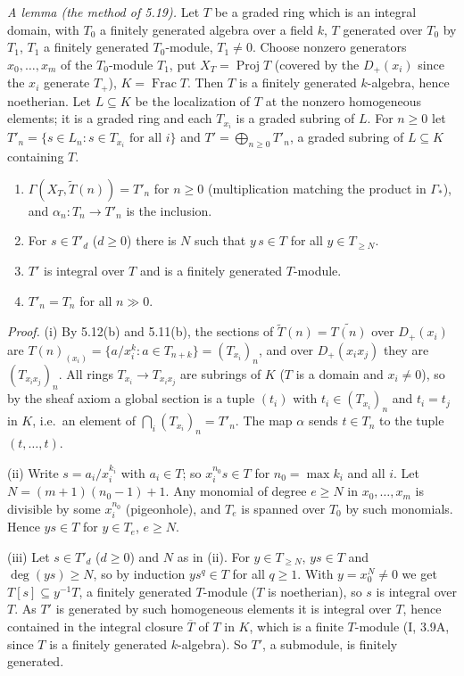 \documentclass[11pt]{article}
\begin{document}
\medskip
\emph{A lemma (the method of 5.19).} Let $T$ be a graded ring which is an integral domain, with $T_0$ a finitely generated algebra over a field $k$, $T$ generated over $T_0$ by $T_1$, $T_1$ a finitely generated $T_0$-module, $T_1\neq0$. Choose nonzero generators $x_0,\dots,x_m$ of the $T_0$-module $T_1$, put $X_T=\operatorname{Proj}T$ (covered by the $D_+(x_i)$ since the $x_i$ generate $T_+$), $K=\operatorname{Frac}T$. Then $T$ is a finitely generated $k$-algebra, hence noetherian. Let $L\subseteq K$ be the localization of $T$ at the nonzero homogeneous elements; it is a graded ring and each $T_{x_i}$ is a graded subring of $L$. For $n\ge0$ let $T'_n=\{s\in L_n: s\in T_{x_i}\text{ for all }i\}$ and $T'=\bigoplus_{n\ge0}T'_n$, a graded subring of $L\subseteq K$ containing $T$.
\begin{enumerate}[label=(\roman*),leftmargin=*]
\item $\Gamma(X_T,\widetilde{T}(n))=T'_n$ for $n\ge0$ (multiplication matching the product in $\Gamma_*$), and $\alpha_n:T_n\to T'_n$ is the inclusion.
\item For $s\in T'_d$ ($d\ge0$) there is $N$ such that $y\,s\in T$ for all $y\in T_{\ge N}$.
\item $T'$ is integral over $T$ and is a finitely generated $T$-module.
\item $T'_n=T_n$ for all $n\gg0$.
\end{enumerate}
\emph{Proof.} (i) By 5.12(b) and 5.11(b), the sections of $\widetilde T(n)=\widetilde{T(n)}$ over $D_+(x_i)$ are $T(n)_{(x_i)}=\{a/x_i^k:a\in T_{n+k}\}=(T_{x_i})_n$, and over $D_+(x_ix_j)$ they are $(T_{x_ix_j})_n$. All rings $T_{x_i}\to T_{x_ix_j}$ are subrings of $K$ ($T$ is a domain and $x_i\ne0$), so by the sheaf axiom a global section is a tuple $(t_i)$ with $t_i\in (T_{x_i})_n$ and $t_i=t_j$ in $K$, i.e.\ an element of $\bigcap_i(T_{x_i})_n=T'_n$. The map $\alpha$ sends $t\in T_n$ to the tuple $(t,\dots,t)$.

(ii) Write $s=a_i/x_i^{k_i}$ with $a_i\in T$; so $x_i^{n_0}s\in T$ for $n_0=\max k_i$ and all $i$. Let $N=(m+1)(n_0-1)+1$. Any monomial of degree $e\ge N$ in $x_0,\dots,x_m$ is divisible by some $x_i^{n_0}$ (pigeonhole), and $T_e$ is spanned over $T_0$ by such monomials. Hence $ys\in T$ for $y\in T_e$, $e\ge N$.

(iii) Let $s\in T'_d$ ($d\ge0$) and $N$ as in (ii). For $y\in T_{\ge N}$, $ys\in T$ and $\deg(ys)\ge N$, so by induction $ys^q\in T$ for all $q\ge1$. With $y=x_0^N\neq0$ we get $T[s]\subseteq y^{-1}T$, a finitely generated $T$-module ($T$ is noetherian), so $s$ is integral over $T$. As $T'$ is generated by such homogeneous elements it is integral over $T$, hence contained in the integral closure $\overline T$ of $T$ in $K$, which is a finite $T$-module (I, 3.9A, since $T$ is a finitely generated $k$-algebra). So $T'$, a submodule, is finitely generated.
\end{document}
